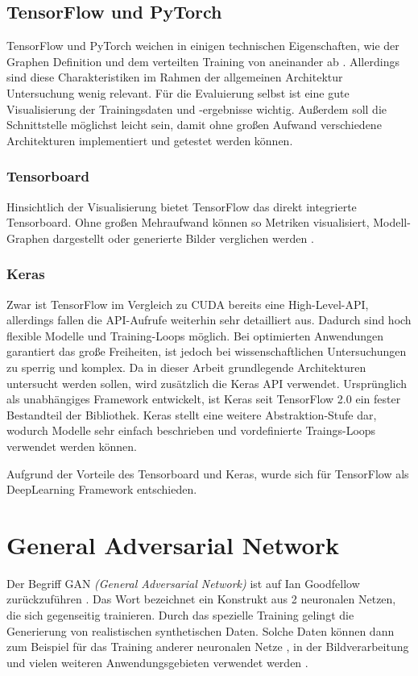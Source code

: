\subsection{TensorFlow und PyTorch}
TensorFlow und PyTorch weichen in einigen technischen Eigenschaften, wie der Graphen Definition und dem verteilten Training von aneinander ab \cite{pytorch-vs-tensorflow}.
Allerdings sind diese Charakteristiken im Rahmen der allgemeinen Architektur Untersuchung wenig relevant.
Für die Evaluierung selbst ist eine gute Visualisierung der Trainingsdaten und -ergebnisse wichtig.
Außerdem soll die Schnittstelle möglichst leicht sein, damit ohne großen Aufwand verschiedene Architekturen implementiert und getestet werden können.

\subsubsection{Tensorboard}
Hinsichtlich der Visualisierung bietet TensorFlow das direkt integrierte Tensorboard.
Ohne großen Mehraufwand können so Metriken visualisiert, Modell-Graphen dargestellt oder generierte Bilder verglichen werden \cite{tensorboard}.

\subsubsection{Keras}
Zwar ist TensorFlow im Vergleich zu CUDA bereits eine High-Level-API, allerdings fallen die API-Aufrufe weiterhin sehr detailliert aus.
Dadurch sind hoch flexible Modelle und Training-Loops möglich.
Bei optimierten Anwendungen garantiert das große Freiheiten, ist jedoch bei wissenschaftlichen Untersuchungen zu sperrig und komplex.
Da in dieser Arbeit grundlegende Architekturen untersucht werden sollen, wird zusätzlich die Keras API \cite{keras} verwendet.
Ursprünglich als unabhängiges Framework entwickelt, ist Keras seit TensorFlow 2.0 ein fester Bestandteil der Bibliothek.
Keras stellt eine weitere Abstraktion-Stufe dar, wodurch Modelle sehr einfach beschrieben und vordefinierte Traings-Loops verwendet werden können.
\newline

Aufgrund der Vorteile des Tensorboard und Keras, wurde sich für TensorFlow als DeepLearning Framework entschieden.

\section{General Adversarial Network}
Der Begriff GAN \textit{(General Adversarial Network)} ist auf Ian Goodfellow zurückzuführen \cite{gan-original-paper}.
Das Wort bezeichnet ein Konstrukt aus 2 neuronalen Netzen, die sich gegenseitig trainieren.
Durch das spezielle Training gelingt die Generierung von realistischen synthetischen Daten.
Solche Daten können dann zum Beispiel für das Training anderer neuronalen Netze \cite{gan-application-augmenting-training-data}, in der Bildverarbeitung \cite{gan-application-upscaling, gan-application-blending} und vielen weiteren Anwendungsgebieten verwendet werden \cite{gan-application-dna-optimizes-protein-functions, gan-application-audio-synthesis}.

